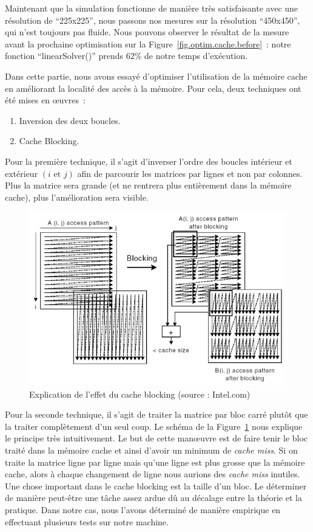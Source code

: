\documentclass[12pt,a4paper]{article}
\begin{document}
Maintenant que la simulation fonctionne de manière très satisfaisante avec une
résolution de \enquote{225x225}, nous passons nos mesures sur la résolution
\enquote{450x450}, qui n'est toujours pas fluide. Nous pouvons observer le
résultat de la mesure avant la prochaine optimisation sur la
Figure~\ref{fig.optim.cache.before} : notre fonction \enquote{linearSolver()}
prends $62\%$ de notre temps d'exécution.

Dans cette partie, nous avons essayé d'optimiser l'utilisation de la mémoire
cache en améliorant la localité des accès à la mémoire. Pour cela, deux
techniques ont été mises en œuvres :
\begin{enumerate}
    \item Inversion des deux boucles.
    \item Cache Blocking.
\end{enumerate}

Pour la première technique, il s'agit d'inverser l'ordre des boucles intérieur
et extérieur $(i \text{ et } j)$ afin de parcourir les matrices par lignes et
non par colonnes. Plus la matrice sera grande (et ne rentrera plus entièrement
dans la mémoire cache), plus l'amélioration sera visible.

\begin{figure}
    \centering
    \includegraphics[scale=0.5]{figures/optims/cache/intel.jpg}
    \caption{Explication de l'effet du cache blocking (source : Intel.com)}
    \label{fig.optim.cache.intel}
\end{figure}

Pour la seconde technique, il s'agit de traiter la matrice par bloc carré plutôt
que la traiter complètement d'un seul coup. Le schéma de la
Figure~\ref{fig.optim.cache.intel} nous explique le principe très intuitivement.
Le but de cette manœuvre est de faire tenir le bloc traité dans la mémoire cache
et ainsi d'avoir un minimum de \textit{cache miss}. Si on traite la matrice
ligne par ligne mais qu'une ligne est plus grosse que la mémoire cache, alors à
chaque changement de ligne nous aurions des \textit{cache miss} inutiles. Une
chose important dans le cache blocking est la taille d'un bloc. Le déterminer de
manière peut-être une tâche assez ardue dû au décalage entre la théorie et la
pratique. Dans notre cas, nous l'avons déterminé de manière empirique en
effectuant plusieurs tests sur notre machine.
\end{document}
